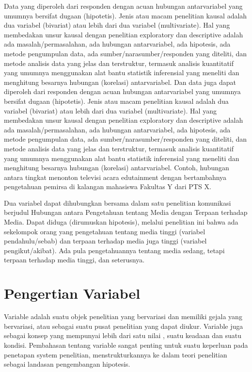 Data yang diperoleh dari responden dengan acuan hubungan antarvariabel yang umumnya bersifat dugaan (hipotetis). Jenis atau 
macam penelitian kausal adalah dua variabel (bivariat) atau lebih dari dua variabel (multivariate). Hal yang membedakan unsur 
kausal dengan penelitian exploratory dan descriptive adalah ada masalah/permasalahan, ada hubungan antarvariabel, ada hipotesis, 
ada metode pengumpulan data, ada sumber/narasumber/responden yang diteliti, dan metode analisis data yang jelas dan terstruktur, 
termasuk analisis kuantitatif yang umumnya menggunakan alat bantu statistik inferensial yang meneliti dan menghitung besarnya 
hubungan (korelasi) antarvariabel.
Dan data juga dapat diperoleh dari responden dengan acuan hubungan antarvariabel yang umumnya bersifat dugaan (hipotetis). Jenis 
atau macam penelitian kausal adalah dua variabel (bivariat) atau lebih dari dua variabel (multivariate). Hal yang membedakan 
unsur kausal dengan penelitian exploratory dan descriptive adalah ada masalah/permasalahan, ada hubungan antarvariabel, ada 
hipotesis, ada metode pengumpulan data, ada sumber/narasumber/responden yang diteliti, dan metode analisis data yang jelas dan 
terstruktur, termasuk analisis kuantitatif yang umumnya menggunakan alat bantu statistik inferensial yang meneliti dan 
menghitung besarnya hubungan (korelasi) antarvariabel. Contoh, hubungan antara tingkat menonton televisi acara edutainment 
dengan bertambahnya pengetahuan pemirsa di kalangan mahasiswa Fakultas Y dari PTS X.

Dua variabel dapat dihubungkan bersama dalam satu penelitian komunikasi berjudul Hubungan antara Pengetahuan tentang Media 
dengan Terpaan terhadap Media. Dapat diduga (dirumuskan hipotesis), melalui penelitian ini bahwa ada sekelompok orang yang 
pengetahuan tentang media tinggi (variabel pendahulu/sebab) dan terpaan terhadap media juga tinggi (variabel pengikut/akibat). 
Ada pula pengetahuannya tentang media sedang, tetapi terpaan terhadap media tinggi, dan seterusnya. 

\section{Pengertian Variabel}
Variable adalah suatu objek penelitian yang bervariasi dan memiliki gejala yang bervariasi, atau sebagai suatu pusat penelitian yang 
dapat diukur. Variable juga sebagai konsep yang mempunyai  lebih dari satu nilai , suatu keadaan dan suatu kondisi. Pembahasan tentang 
variable sangat  penting  untuk suatu keperluan pada penetapan system penelitian, menstrukturkannya ke dalam teori penelitian sebagai 
landasan pengembangan hipotesis.

